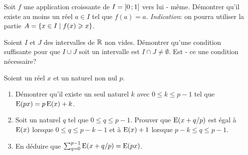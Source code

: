 \begin{exercice}
  Soit \(f\) une application croissante de \(I = \left[ 0 \, ; {} 1 \right]\) vers lui 
  - même. Démontrer qu'il existe au moins un réel \(a \in I\) tel que \(f(a) = 
  a\).
  \emph{Indication}: on pourra utiliser la partie \(A = \left\{x \in I\mathrel{}\middle|\mathrel{}f(x) 
  \geqslant x\right\}\).
\end{exercice}

\begin{exercice}
  Soient \(I\) et \(J\) des intervalles de \(\mathbb{R}\) non vides. Démontrer qu'une 
  condition suffisante pour que \(I \cup J\) soit un intervalle est \(I \cap J 
  \neq \emptyset\). Est - ce une condition nécessaire?
\end{exercice}

\begin{exercice}
  Soient un réel \(x\) et un naturel non nul \(p\).
  \begin{enumerate}
    \item Démontrer qu'il existe un seul naturel \(k\) avec \(0 \leqslant k 
      \leqslant p - 1\) tel que \(\operatorname{E}(px) = p\operatorname{E}(x) + k\).
    \item Soit un naturel \(q\) tel que \(0 \leqslant q \leqslant p - 1\).  
      Prouver que \(\operatorname{E}(x + q/p)\) est égal à \(\operatorname{E}(x)\) lorsque \(0 \leqslant 
      q \leqslant p - k - 1\) et à \(\operatorname{E}(x) + 1\) lorsque \(p - k\leqslant q 
      \leqslant p - 1\).
    \item En déduire que \(\sum_{q = 0}^{p - 1} \operatorname{E}(x + q/p) = \operatorname{E}(px)\).
  \end{enumerate}
\end{exercice}
